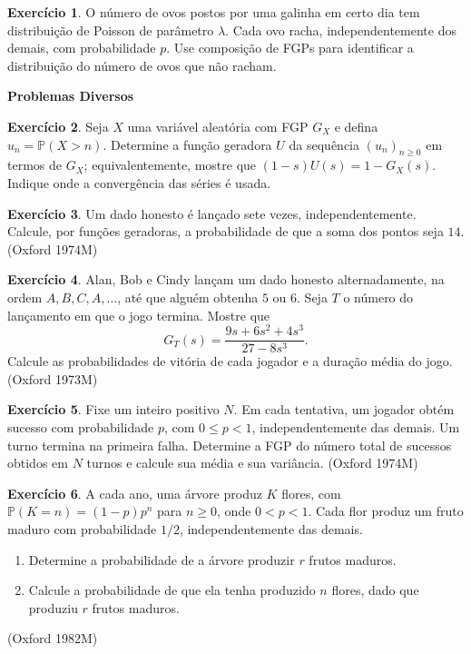 \documentclass[12pt,portuguese]{article}
\theoremstyle{definition}
\theoremstyle{plainexercise}
\newtheorem{exercise}{Exercício}
\theoremstyle{starredexercise}
\theoremstyle{definition}
\begin{document}
\begin{exercise}\label{exercise:gw-4-42}
O número de ovos postos por uma galinha em certo dia tem distribuição de
Poisson de parâmetro $\lambda$. Cada ovo racha, independentemente dos demais,
com probabilidade $p$. Use composição de FGPs para identificar a distribuição
do número de ovos que não racham.
\end{exercise}

\medskip
\noindent\textbf{Problemas Diversos}

\begin{exercise}\label{exercise:gw-prob-1}
Seja $X$ uma variável aleatória com FGP $G_X$ e defina
$u_n=\mathbb{P}(X>n)$. Determine a função geradora $U$ da sequência
$(u_n)_{n\geqslant0}$ em termos de $G_X$; equivalentemente, mostre que
$(1-s)U(s)=1-G_X(s)$. Indique onde a convergência das séries é usada.
\end{exercise}

\begin{exercise}\label{exercise:gw-prob-2}
Um dado honesto é lançado sete vezes, independentemente. Calcule, por funções
geradoras, a probabilidade de que a soma dos pontos seja $14$.
(Oxford 1974M)
\end{exercise}

\begin{exercise}\label{exercise:gw-prob-3}
Alan, Bob e Cindy lançam um dado honesto alternadamente, na ordem
$A,B,C,A,\ldots$, até que alguém obtenha $5$ ou $6$. Seja $T$ o número do
lançamento em que o jogo termina. Mostre que
\[
G_T(s)=\frac{9s+6s^2+4s^3}{27-8s^3}.
\]
Calcule as probabilidades de vitória de cada jogador e a duração média do
jogo. (Oxford 1973M)
\end{exercise}

\begin{exercise}\label{exercise:gw-prob-4}
Fixe um inteiro positivo $N$. Em cada tentativa, um jogador obtém sucesso com
probabilidade $p$, com $0\leqslant p<1$, independentemente das demais. Um turno
termina na primeira falha. Determine a FGP do número total de sucessos obtidos em $N$ turnos e
calcule sua média e sua variância. (Oxford 1974M)
\end{exercise}

\begin{exercise}\label{exercise:gw-prob-5}
A cada ano, uma árvore produz $K$ flores, com
$\mathbb{P}(K=n)=(1-p)p^n$ para $n\geqslant0$, onde $0<p<1$. Cada flor
produz um fruto maduro com probabilidade $1/2$, independentemente das demais.
\begin{enumerate}[label=(\alph*)]
\item Determine a probabilidade de a árvore produzir $r$ frutos maduros.
\item Calcule a probabilidade de que ela tenha produzido $n$ flores, dado que
produziu $r$ frutos maduros.
\end{enumerate}
(Oxford 1982M)
\end{exercise}
\end{document}
